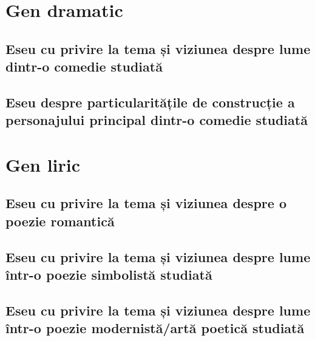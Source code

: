 \documentclass[
 12pt,                       %
 a4paper                     %
]{book}
\begin{document}
\part{Gen dramatic}


\chapter{Eseu cu privire la tema și viziunea despre lume dintr-o comedie studiată}


\chapter{Eseu despre particularitățile de construcție a personajului principal dintr-o comedie studiată}




\part{Gen liric}


\chapter{Eseu cu privire la tema și viziunea despre o poezie romantică}



\chapter{Eseu cu privire la tema și viziunea despre lume într-o poezie simbolistă studiată}


\chapter{Eseu cu privire la tema și viziunea despre lume într-o poezie modernistă/artă poetică studiată}

\end{document}
